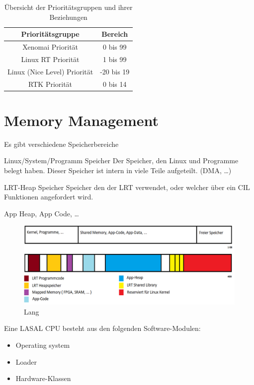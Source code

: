 \documentclass[MMR,Master,english]{twbook}
\begin{document}
\begin{table}[ht]
    \centering
    \caption{Übersicht der Prioritätsgruppen und ihrer Beziehungen}
    \label{tab:priorities}
    \begin{tabular}{|c|c|}
        \hline
        \textbf{Prioritätsgruppe} & \textbf{Bereich}  \\ \hline
        Xenomai Priorität & 0 bis 99  \\ \hline
        Linux RT Priorität & 1 bis 99 \\ \hline
        Linux (Nice Level) Priorität & -20 bis 19  \\ \hline
        RTK Priorität & 0 bis 14 \\ \hline
    \end{tabular}

\end{table}
 



\section{Memory Management}
Es gibt verschiedene Speicherbereiche

Linux/System/Programm Speicher
	Der Speicher, den Linux und Programme belegt haben.
	Dieser Speicher ist intern in viele Teile aufgeteilt. (DMA, …)

LRT-Heap Speicher
	Speicher den der LRT verwendet, oder welcher über ein CIL Funktionen
	angefordert wird.

App Heap, App Code, …


\begin{figure}[H]
    \centering
    \includegraphics[width=0.8\columnwidth]{img/RAM_Memory_management.png}
    \caption[Kurz]{Lang}
    \label{fig:memory_management}
  \end{figure}


  Eine LASAL CPU besteht aus den folgenden Software-Modulen:
  \begin{itemize}
    \item Operating system
    \item Loader
    \item Hardware-Klassen
  \end{itemize}
  
\end{document}
